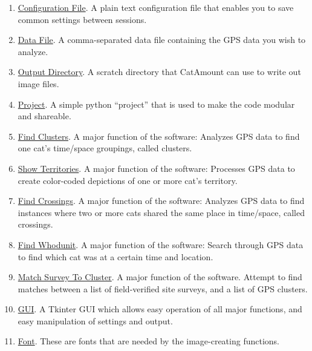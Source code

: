 \begin{enumerate}

\item \hyperlink{configuration-file}{Configuration File}. A plain text
  configuration file that enables you to save common settings between
  sessions.

\item \hyperlink{data-file}{Data File}. A comma-separated data file
  containing the GPS data you wish to analyze.

\item \hyperlink{output-directory}{Output Directory}. A scratch
  directory that CatAmount can use to write out image files.

\item \hyperlink{project}{Project}. A simple python ``project'' that
  is used to make the code modular and shareable.

\item \hyperlink{find-clusters}{Find Clusters}. A major function of
  the software: Analyzes GPS data to find one cat's time/space
  groupings, called clusters.

\item \hyperlink{show-territories}{Show Territories}. A major function
  of the software: Processes GPS data to create color-coded depictions
  of one or more cat's territory.

\item \hyperlink{find-crossings}{Find Crossings}. A major function of
  the software: Analyzes GPS data to find instances where two or more
  cats shared the same place in time/space, called crossings.

\item \hyperlink{find-whodunit}{Find Whodunit}. A major function of
  the software: Search through GPS data to find which cat was at a
  certain time and location.

\item \hyperlink{match-survey-to-cluster}{Match Survey To Cluster}. A
  major function of the software. Attempt to find matches between a
  list of field-verified site surveys, and a list of GPS clusters.

\item \hyperlink{gui}{GUI}. A Tkinter GUI which allows easy operation
  of all major functions, and easy manipulation of settings and
  output.

\item \hyperlink{font}{Font}. These are fonts that are needed by the
  image-creating functions.

\end{enumerate}
